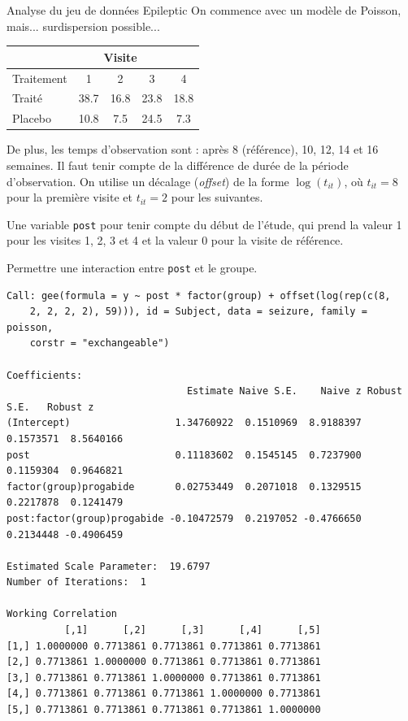 \documentclass{BeamerTemplate}
\begin{document}
\begin{refsection}
\begin{frame}{Analyse du jeu de données Epileptic}
\bigskip
On commence avec un modèle de Poisson, mais... surdispersion possible...

\bigskip
  \begin{tabular}{lcccc}
\hline
\multicolumn{1}{l}{} & \multicolumn{3}{c}{Visite}\\
\hline
Traitement & 1 & 2 & 3 & 4\\
\hline
Traité & 38.7 & 16.8 & 23.8 & 18.8 \\
Placebo & 10.8 & 7.5 & 24.5 & 7.3\\
\hline
  \end{tabular}
\end{frame}


\begin{frame}{}
De plus, les temps d'observation sont : après 8 (référence), 10, 12, 14 et 16
semaines. Il faut tenir compte de la différence de durée de la
période d'observation. On utilise un décalage (\textit{offset}) de la forme $\log(t_{it})$,
où $t_{it}=8$ pour la première visite et $t_{it}=2$ pour les
suivantes.

\bigskip
Une variable \texttt{post} pour tenir compte du début de l'étude,
qui prend la valeur 1 pour les visites 1, 2, 3 et 4 et la valeur 0 pour
la visite de référence.

\bigskip
Permettre une interaction entre \texttt{post} et le groupe.

\end{frame}

\begin{frame}[fragile]{}
{\tiny
\begin{verbatim}
Call: gee(formula = y ~ post * factor(group) + offset(log(rep(c(8, 
    2, 2, 2, 2), 59))), id = Subject, data = seizure, family = poisson, 
    corstr = "exchangeable")

Coefficients:
                               Estimate Naive S.E.    Naive z Robust S.E.   Robust z
(Intercept)                  1.34760922  0.1510969  8.9188397   0.1573571  8.5640166
post                         0.11183602  0.1545145  0.7237900   0.1159304  0.9646821
factor(group)progabide       0.02753449  0.2071018  0.1329515   0.2217878  0.1241479
post:factor(group)progabide -0.10472579  0.2197052 -0.4766650   0.2134448 -0.4906459

Estimated Scale Parameter:  19.6797
Number of Iterations:  1

Working Correlation
          [,1]      [,2]      [,3]      [,4]      [,5]
[1,] 1.0000000 0.7713861 0.7713861 0.7713861 0.7713861
[2,] 0.7713861 1.0000000 0.7713861 0.7713861 0.7713861
[3,] 0.7713861 0.7713861 1.0000000 0.7713861 0.7713861
[4,] 0.7713861 0.7713861 0.7713861 1.0000000 0.7713861
[5,] 0.7713861 0.7713861 0.7713861 0.7713861 1.0000000
\end{verbatim}
}
\end{frame}


\end{refsection}
\end{document}
